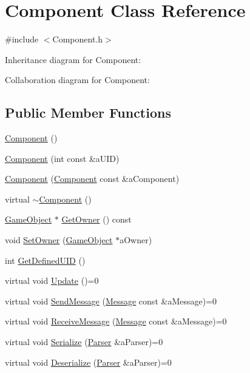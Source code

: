 \hypertarget{classComponent}{}\section{Component Class Reference}
\label{classComponent}


{\ttfamily \#include $<$Component.\+h$>$}



Inheritance diagram for Component\+:


Collaboration diagram for Component\+:
\subsection*{Public Member Functions}
\begin{DoxyCompactItemize}
\item 
\hyperlink{classComponent_a8775db6d1a2c1afc2e77cd3c8f39da6f}{Component} ()
\item 
\hyperlink{classComponent_a7b8a94ef459c5ecb19055c51039e9f1b}{Component} (int const \&a\+U\+ID)
\item 
\hyperlink{classComponent_a057de53077c3254054067e0a05cb6966}{Component} (\hyperlink{classComponent}{Component} const \&a\+Component)
\item 
virtual \hyperlink{classComponent_a2e9aa4348314d981f05f67397ad2f872}{$\sim$\+Component} ()
\item 
\hyperlink{classGameObject}{Game\+Object} $\ast$ \hyperlink{classComponent_a0767b97b1145de355b8ac4437fcfecfe}{Get\+Owner} () const 
\item 
void \hyperlink{classComponent_a4f915a5ce290238aecd141aecf420dfc}{Set\+Owner} (\hyperlink{classGameObject}{Game\+Object} $\ast$a\+Owner)
\item 
int \hyperlink{classComponent_a95c0d5ab3e67ec8f45d981b1fe3960b7}{Get\+Defined\+U\+ID} ()
\item 
virtual void \hyperlink{classComponent_abda56474d6ccfbdab47cb5e0cd595c2b}{Update} ()=0
\item 
virtual void \hyperlink{classComponent_ad5f05e33c116c7eaa0e8f4f12447998d}{Send\+Message} (\hyperlink{classMessage}{Message} const \&a\+Message)=0
\item 
virtual void \hyperlink{classComponent_a23c98ed51e86362def45b4b4e1e775b6}{Receive\+Message} (\hyperlink{classMessage}{Message} const \&a\+Message)=0
\item 
virtual void \hyperlink{classComponent_a1739b9ad5a77194c80da069311d4f9d5}{Serialize} (\hyperlink{classParser}{Parser} \&a\+Parser)=0
\item 
virtual void \hyperlink{classComponent_a3a643593142fb0e6429fbdc6dddf1950}{Deserialize} (\hyperlink{classParser}{Parser} \&a\+Parser)=0
\end{DoxyCompactItemize}
